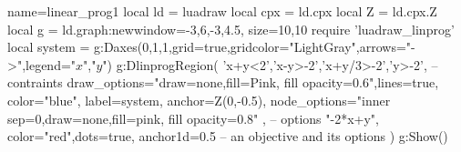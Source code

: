 \begin{luadraw}{name=linear_prog1}
local ld = luadraw
local cpx = ld.cpx
local Z = ld.cpx.Z
local g = ld.graph:new{window={-3,6,-3,4.5}, size={10,10}}
require 'luadraw_linprog'
local system = 
g:Daxes({0,1,1},{grid=true,gridcolor="LightGray",arrows="->",legend={"$x$","$y$"}})
g:DlinprogRegion(
    {'x+y<2','x-y>-2','x+y/3>-2','y>-2'}, -- contraints
    {draw_options="draw=none,fill=Pink, fill opacity=0.6",lines=true, color="blue", label=system, anchor=Z(0,-0.5),
    node_options="inner sep=0,draw=none,fill=pink, fill opacity=0.8" }, -- options
    {"-2*x+y"}, {color="red",dots=true, anchor1d=0.5} -- an objective and its options
    )
g:Show()
\end{luadraw}
